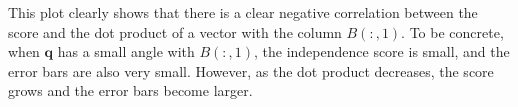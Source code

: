 \documentclass[letterpaper]{article}
\newcommand{\balpha}{\pmb{\alpha}}
\newcommand{\br}{\pmb{r}}
\newcommand{\bbeta}{\pmb{\beta}}
\newcommand{\E}{\mathbb{E}}
\newcommand{\cov}{\text{cov}}
\newcommand\bindent{%
  \begingroup
  \setlength{\itemindent}{\myindent}
  \addtolength{\algorithmicindent}{\myindent}
}
\newcommand\eindent{\endgroup}
\newlength\myindent
\newcommand{\bb}[1]{\left(#1\right)}
\begin{document}
This plot clearly shows that there is a clear negative correlation between the score and the dot product of a vector with the column $B(:,1)$. To be concrete, when $\mathbf{q}$ has a small angle with $B(:,1)$, the independence score is small, and the error bars are also very small. However, as the dot product decreases, the score grows and the error bars become larger.
\end{document}
